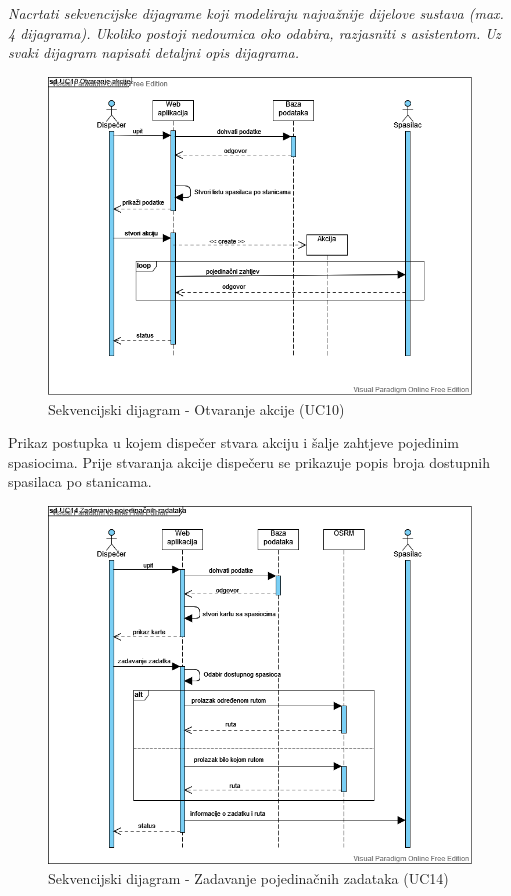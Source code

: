 				\textit{Nacrtati sekvencijske dijagrame koji modeliraju najvažnije dijelove sustava (max. 4 dijagrama). Ukoliko postoji nedoumica oko odabira, razjasniti s asistentom. Uz svaki dijagram napisati detaljni opis dijagrama.}
				\begin{figure}[H]
					\includegraphics[scale=0.5]{slike/dispatcher_sequence.PNG}
					\centering
					\caption{Sekvencijski dijagram - Otvaranje akcije (UC10)}
					\label{fig:UC10}
				\end{figure}
			
				Prikaz postupka u kojem dispečer stvara akciju i šalje zahtjeve pojedinim spasiocima. Prije stvaranja akcije
				dispečeru se prikazuje popis broja dostupnih spasilaca po stanicama.
			
				\begin{figure}[H]
					\includegraphics[scale=0.5]{slike/zadavanje_zadataka.png}
					\centering
					\caption{Sekvencijski dijagram - Zadavanje pojedinačnih zadataka (UC14)}
					\label{fig:UC14}
				\end{figure}
				
